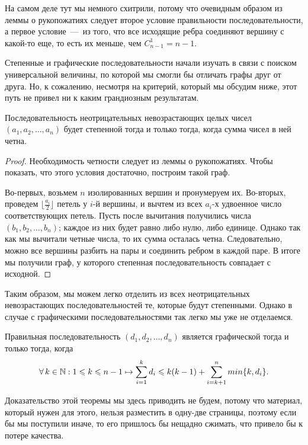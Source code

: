 	На самом деле тут мы немного схитрили, потому что очевидным образом из леммы о рукопожатиях следует второе условие 
	правильности последовательности, а первое условие~---~из того, что все исходящие ребра соединяют вершину с какой-то еще, 
	то есть их меньше, чем $C_{n-1}^1 = n-1$. 
	
	Степенные и графические последовательности начали изучать в связи с поиском универсальной величины, по которой мы смогли 
	бы отличать графы друг от друга. Но, к сожалению, несмотря на критерий, который мы обсудим ниже, этот путь не привел ни к 
	каким грандиозным результатам.	
	
\begin{statement}
	Последовательность неотрицательных невозрастающих целых чисел $(a_1, a_2, \dots, a_n)$ будет степенной тогда и только тогда, 
	когда сумма чисел в ней четна.
	
\begin{proof}
	Необходимость четности следует из леммы о рукопожатиях. Чтобы показать, что этого условия достаточно, построим такой граф.
	
	Во-первых, возьмем $n$ изолированных вершин и пронумеруем их. Во-вторых, проведем $\lfloor \frac{a_i}{2} \rfloor$ петель у $i$-й вершины, 
	и вычтем из всех $a_i$-х удвоенное число соответствующих петель. Пусть после вычитания получились числа $(b_1, b_2, \dots, b_n)$; 
	каждое из них будет равно либо нулю, либо единице. Однако так как мы вычитали четные числа, то их сумма осталась четна. 
	Следовательно, можно все вершины разбить на пары и соединить ребром в каждой паре. В итоге мы получили граф, 
	у которого степенная последовательность совпадает с исходной.
\end{proof}\end{statement}

	Таким образом, мы можем легко отделить из всех неотрицательных невозрастающих последовательностей те, 
	которые будут степенными. Однако в случае с графическими последовательностями так легко мы уже не отделаемся.

\begin{theorem}
	Правильная последовательность $(d_1, d_2, \dots, d_n)$ является графической тогда и только тогда, когда 
	$$\forall \!\ k \in \mathbb{N}: 1 \leqslant k \leqslant n-1 \mapsto \sum_{i=1}^k d_i \leqslant k(k-1) + \sum_{i=k+1}^n min \lbrace k, d_i \rbrace. $$
\end{theorem}

	Доказательство этой теоремы мы здесь приводить не будем, потому что материал, который нужен для этого, нельзя разместить 
	в одну-две страницы, поэтому если бы мы поступили иначе, то его пришлось бы нещадно сжимать, что привело бы к потере качества.


